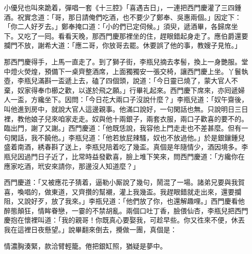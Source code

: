 小優兒也叫來跪着，彈唱一套《十三腔》「喜遇吉日」，一連把西門慶灌了三四鍾酒。祝實念道：「哥，那日請俺們吃酒，也不要少了鄭奉、吳惠兩個。」因定下：「你二人好歹去。」鄭奉掩口道：「小的們已定伺候。」須臾，遞酒畢，各歸席坐下。又吃了一囘。看看天晚，那西門慶那裡坐的住，趕眼錯起身走了。應伯爵還要攔門不放，謝希大道：「應二哥，你放哥去罷。休要誤了他的事，教嫂子見恠。」

那西門慶得手，上馬一直走了。到了獅子街，李瓶兒摘去孝髻，換上一身艷服。堂中燈火熒煌，預備下一桌齊整酒席，{}上面獨獨安一張交椅，讓西門慶上坐。丫鬟執壺，李瓶兒滿斟一盃遞上去，磕了四個頭，說道：「今日靈已燒了，蒙大官人不棄，奴家得奉巾櫛之歡，以遂於飛之願。」行畢礼起來。西門慶下席來，亦囘遞婦人一盃，方纔坐下。因問：「今日花大兩口子沒說什麼？」{}李瓶兒道：「奴午齋後，叫他進到房中，就說大官人這邊親事。他滿口說好，一句閑話也無。只說明日三日裡，教他娘子兒來咱家走走。奴與他十兩銀子，兩套衣服，兩口子歡喜的要不的。臨出門，謝了又謝。」西門慶道：「他既恁說，我容他上門走走也不差甚麼。但有一句閑話，我不饒他。」{}李瓶兒道：「他若放屁辣騷，奴也不放過他。」於是銀鑲鍾兒盛着南酒，綉春斟了送上，李瓶兒陪着吃了幾盃。真個是年隨情少，酒因境多。李瓶兒因過門日子近了，比常時益發歡喜，臉上堆下笑來，問西門慶道：「方纔你在應家吃酒，玳安來請你，那邊沒人知道麼？」

西門慶道：「又被應花子猜着，逼勒小厮說了幾句，鬧混了一場。諸弟兄要與我賀喜，喚唱的，做東道，又齊攢的幫襯，灌上我幾盃。我趕眼錯就走出來，還要攔阻，又說好歹，放了我來。」{}李瓶兒道：「他們放了你，也還解趣哩。」西門慶看他醉態顛狂，情眸眷戀，一霎的不禁胡亂。兩個口吐丁香，臉偎仙杏，李瓶兒把西門慶抱在懷裡叫道：「我的親哥！你既真心要娶我，可趁早些。{}你又徃來不便，休丟我在這裡日夜懸望。」說畢翻來倒去，攪做一團，真個是：

情濃胸湊緊，款洽臂輕籠。倦把銀缸照，猶疑是夢中。

 


